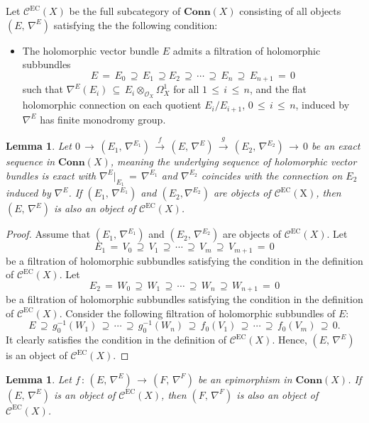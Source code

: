 \documentclass[12pt]{amsart}
\newtheorem{lemma}[theorem]{Lemma}
\theoremstyle{definition}
\numberwithin{equation}{section}
\newcommand{\EC}{\mathcal{C}^\mathrm{EC}}
\begin{document}
Let $\EC(X)$ be the full subcategory of $\mathbf{Conn}(X)$ consisting of all objects
$(E,\,\nabla^E)$ satisfying the the following condition:
\begin{itemize}
\item The holomorphic vector bundle $E$ admits a filtration of holomorphic subbundles
$$
E\,=\,E_0\,\supseteq\, E_1 \,\supseteq E_2\, \supseteq\,\cdots\, \supseteq\, E_{n}\,
\supseteq\, E_{n+1}\,=\, 0
$$
such that $\nabla^E(E_i) \,\subseteq\, E_i \otimes_{\mathcal{O}_X} \Omega_X^1$ for all 
$1\, \leq\, i\, \leq\, n$,  and the flat holomorphic connection on each quotient
$E_i/E_{i+1}$, $0\, \leq\, i\, \leq\, n$, induced by $\nabla^E$ has finite monodromy group.
\end{itemize}

\begin{lemma}\label{lemma-ext}
Let $0\,\longrightarrow\, (E_1,\, \nabla^{E_1})\,\stackrel{f}{\longrightarrow}\,
(E, \,\nabla^E)\, \stackrel{g}{\longrightarrow}\, (E_2,\, \nabla^{E_2})\,\longrightarrow\, 0$
be an exact sequence in $\mathbf{Conn}(X)$, meaning the underlying sequence of holomorphic 
vector bundles
is exact with $\nabla^E\big\vert_{E_1} \,=\, \nabla^{E_1}$ and $\nabla^{E_2}$ coincides
with the connection on $E_2$ induced by $\nabla^E$.
If $(E_1,\, \nabla^{E_1})$ and $(E_2, \nabla^{E_2})$ are objects of $\mathrm{\EC(X)}$, 
then $(E, \,\nabla^E)$ is also an object of $\EC(X)$.
\end{lemma}

\begin{proof}
Assume that $(E_1,\, \nabla^{E_1})$ and $(E_2,\, \nabla^{E_2})$ are objects of $\EC(X)$. Let
$$
E_1\,=\,V_0\,\supseteq\, V_1 \, \supseteq\,\cdots\, \supseteq\, V_{m}\,
\supseteq\, V_{m+1}\,=\, 0
$$
be a filtration of holomorphic subbundles satisfying the condition in the definition of
$\EC(X)$. Let
$$
E_2\,=\,W_0\,\supseteq\, W_1 \, \supseteq\,\cdots\, \supseteq\, W_{n}\,
\supseteq\, W_{n+1}\,=\, 0
$$
be a filtration of holomorphic subbundles satisfying the condition in the definition of
$\EC(X)$. Consider the following filtration of holomorphic subbundles of $E$:
$$
E\, \supseteq\, g^{-1}_0(W_1) \, \supseteq\,\cdots\, \supseteq\, g^{-1}_0(W_n)\,
\supseteq\, f_0(V_1) \, \supseteq\,\cdots\, \supseteq\, f_0(V_m) \, \supseteq \, 0.
$$
It clearly satisfies the condition in the definition of $\EC(X)$. Hence, 
$(E, \,\nabla^E)$ is an object of $\EC(X)$.
\end{proof}

\begin{lemma}\label{epi-lemma}
Let $f\,:\, (E,\, \nabla^E) \,\longrightarrow\, (F,\, \nabla^F)$ be an epimorphism in 
$\mathbf{Conn}(X)$. If $(E,\, \nabla^E)$ is an object of $\EC(X)$, then $(F,\, \nabla^F)$ 
is also an object of $\EC(X)$.
\end{lemma}
\end{document}
